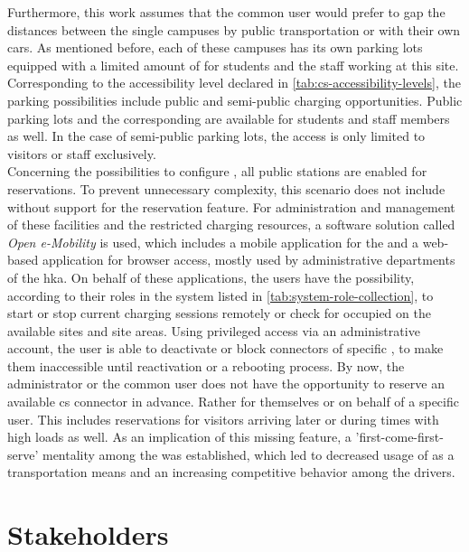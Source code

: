 \noindent Furthermore, this work assumes that the common user would prefer to gap the distances between the single campuses by public transportation or with their own cars.
As mentioned before, each of these campuses has its own parking lots equipped with a limited amount of  for students and the staff working at this site. Corresponding to the accessibility level declared in \ref{tab:cs-accessibility-levels}, the parking possibilities include public and semi-public charging opportunities.
Public parking lots and the corresponding  are available for students and staff members as well. In the case of semi-public parking lots, the access is only limited to visitors or staff exclusively. \\
Concerning the possibilities to configure , all public stations are enabled for reservations. To prevent unnecessary complexity, this scenario does not include  without support for the reservation feature.
For administration and management of these facilities and the restricted charging resources, a software solution called \textit{Open e-Mobility} \cite{noauthor_github_nodate,noauthor_github_nodate-1,noauthor_github_nodate-3} is used, which includes a mobile application for the  and a web-based application for browser access, mostly used by administrative departments of the \acrshort{hka}. 
On behalf of these applications, the users have the possibility, according to their roles in the system listed in \ref{tab:system-role-collection}, to start or stop current charging sessions remotely or check for occupied  on the available sites and site areas.
Using privileged access via an administrative account, the user is able to deactivate or block connectors of specific , to make them inaccessible until reactivation or a rebooting process.
By now, the administrator or the common user does not have the opportunity to reserve an available \acrshort{cs} connector in advance. Rather for themselves or on behalf of a specific user. This includes reservations for visitors arriving later or during times with high loads as well.
As an implication of this missing feature, a 'first-come-first-serve' mentality among the  was established, which led to decreased usage of  as a transportation means and an increasing competitive behavior among the drivers.

\section{Stakeholders}
\label{ch:Requirements Engineering:sec:Stakeholders}

